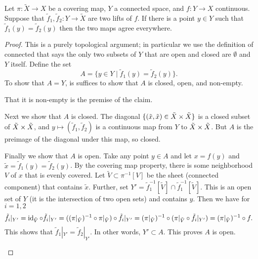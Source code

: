 \begin{lemma}
\label{lem:lift unique}
Let $\pi : \tilde{X} \to X$ be a covering map, $Y$ a connected space, and $f : Y \to X$ continuous.
Suppose that $\tilde{f}_1, \tilde{f}_2 : Y \to \tilde{X}$ are two lifts of $f$.
If there is a point $y \in Y$ such that $\tilde{f}_1(y) = \tilde{f}_2(y)$ then the two maps agree everywhere.
\end{lemma}
\begin{proof}
This is a purely topological argument; in particular we use the definition of connected that says the only two subsets of $Y$ that are open and closed are $\emptyset$ and $Y$ itself.
Define the set
\[
A = \{ y \in Y \mid \tilde{f}_1(y) = \tilde{f}_2(y) \}.
\]
To show that $A = Y$, is suffices to show that $A$ is closed, open, and non-empty.

That it is non-empty is the premise of the claim.

Next we show that $A$ is closed. 
The diagonal $\{(\tilde{x},\tilde{x}) \in \Tilde{X} \times \tilde{X} \}$ is a closed subset of $\Tilde{X} \times \tilde{X}$, and $y \mapsto (\tilde{f}_1,\tilde{f}_2)$ is a continuous map from $Y$ to $\Tilde{X} \times \tilde{X}$.
But $A$ is the preimage of the diagonal under this map, so closed.

Finally we show that $A$ is open.
Take any point $y \in A$ and let $x = f(y)$ and $\tilde{x} = \tilde{f}_1(y) = \tilde{f}_2(y)$.
By the covering map property, there is some neighborhood $V$ of $x$ that is evenly covered.
Let $\tilde{V} \subset \pi^{-1}[V]$ be the sheet (connected component) that contains $\tilde{x}$.
Further, set $Y' = \tilde{f}_1^{-1}[\tilde{V}] \cap \tilde{f}_1^{-1}[\tilde{V}]$.
This is an open set of $Y$ (it is the intersection of two open sets) and contains $y$.
Then we have for $i = 1,2$
\[
\tilde{f}_i|_{Y'}
= \operatorname{id}_{\tilde{V}} \circ \tilde{f}_i|_{Y'}
= ((\pi|_{\tilde{V}})^{-1} \circ \pi|_{\tilde{V}}) \circ \tilde{f}_i|_{Y'}
= (\pi|_{\tilde{V}})^{-1} \circ (\pi|_{\tilde{V}} \circ \tilde{f}_i|_{Y'})
= (\pi|_{\tilde{V}})^{-1} \circ f.
\]
This shows that $\tilde{f}_1|_{Y'} = \tilde{f}_2|_{Y'}$.
In other words, $Y' \subset A$.
This proves $A$ is open.

\begin{center}
\end{center}
\end{proof}
